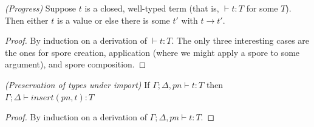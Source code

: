 \documentclass{llncs}
\newcommand{\seq}[1]{\overline{#1}}
\begin{document}






\begin{theorem}
\emph{(Progress)}
\label{th:progress}
Suppose $t$ is a closed, well-typed term (that is, $\vdash t : T$ for some $T$). Then either $t$ is a value or else there is some $t'$ with $t \rightarrow t'$.
\vspace{-2.5mm}
\end{theorem}
\begin{proof}
By induction on a derivation of $\vdash t : T$. The only three interesting cases are the ones for spore creation, application (where we might apply a spore to some argument), and spore composition.
\end{proof}


\begin{lemma}
\emph{(Preservation of types under import)}
\label{lem:pres-import}
If $\Gamma ; \Delta, pn \vdash t : T$ then $\Gamma ; \Delta \vdash insert(pn, t) : T$
\vspace{-2.5mm}
\end{lemma}
\begin{proof}
By induction on a derivation of $\Gamma ; \Delta, pn \vdash t : T$.
\end{proof}
\end{document}
